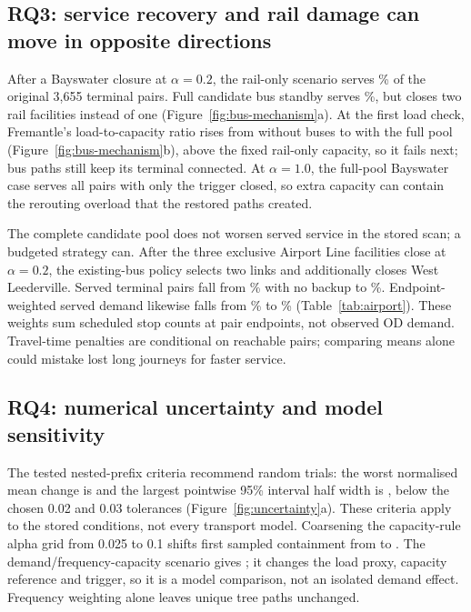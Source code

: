 \subsection{RQ3: service recovery and rail damage can move in opposite directions}
After a Bayswater closure at $\alpha=0.2$, the rail-only scenario serves
\BayRailServicePercent\% of the original 3,655 terminal pairs. Full candidate
bus standby serves \BayBusServicePercent\%, but closes two rail facilities
instead of one (Figure~\ref{fig:bus-mechanism}a). At the first load check,
Fremantle's load-to-capacity ratio rises from \FremantleRailRatio{} without
buses to \FremantleBusRatio{} with the full pool
(Figure~\ref{fig:bus-mechanism}b), above the fixed rail-only capacity, so it
fails next; bus paths still keep its terminal connected. At $\alpha=1.0$, the
full-pool Bayswater case serves all pairs with only the trigger closed, so
extra capacity can contain the rerouting overload that the restored paths
created.

The complete candidate pool does not worsen served service in the stored scan;
a budgeted strategy can. After the three exclusive Airport Line facilities
close at $\alpha=0.2$, the existing-bus policy selects two links and additionally
closes West Leederville. Served terminal pairs fall from
\AirportRailServicePercent\% with no backup to \AirportBusServicePercent\%.
Endpoint-weighted served demand likewise falls from
\AirportRailDemandPercent\% to \AirportBusDemandPercent\%
(Table~\ref{tab:airport}). These weights sum scheduled stop counts at pair
endpoints, not observed OD demand. Travel-time penalties are conditional on
reachable pairs; comparing means alone could mistake lost long journeys for
faster service.

\subsection{RQ4: numerical uncertainty and model sensitivity}
The tested nested-prefix criteria recommend \RecommendedSeeds{} random trials:
the worst normalised mean change is \WorstMeanChange{} and the largest pointwise
95\% interval half width is \WorstHalfWidth{}, below the chosen 0.02 and 0.03
tolerances (Figure~\ref{fig:uncertainty}a). These criteria apply to the stored
conditions, not every transport model. Coarsening the capacity-rule alpha grid
from 0.025 to 0.1 shifts first sampled containment from
\CapacityAlphaStar{} to \CoarseAlphaStar{}. The demand/frequency-capacity
scenario gives \DemandAlphaStar{}; it changes the load proxy, capacity
reference and trigger, so it is a model comparison, not an isolated demand
effect. Frequency weighting alone leaves unique tree paths unchanged.

